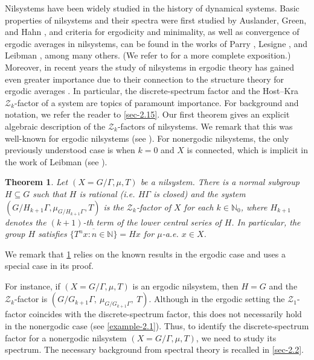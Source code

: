 \documentclass[letter, 11pt]{article}
\newtheorem{theorem}{Theorem}[section]
\theoremstyle{definition}
\theoremstyle{plain}
\newcommand{\N}{\mathbb{N}}
\newcommand{\1}{\mathbbm{1}}
\begin{document}
Nilsystems have been widely studied in the history of dynamical systems. Basic properties of nilsystems and their spectra were first studied by Auslander, Green, and Hahn \cite{Auslander_Green_Hahn63}, and criteria for ergodicity and minimality, as well as convergence of ergodic averages in nilsystems, can be found in the works of Parry \cite{Parry70}, Lesigne \cite{Lesigne_1991}, and Leibman \cite{Leibman05a,Leibman_pointwise_average_polynomial_nil_Zd:2005}, among many others. (We refer to \cite{Host_Kra_nilpotent_structures_ergodic_theory:2018} for a more complete exposition.) Moreover, in recent years the study of nilsystems in ergodic theory has gained even greater importance due to their connection to the structure theory for ergodic averages \cite{Host_Kra_nonconventional_averages_nilmanifolds:2005}. In particular, the discrete-spectrum factor and the Host--Kra $\mathcal{Z}_k$-factor of a system are topics of paramount importance. For background and notation, we refer the reader to \cref{sec-2.15}. Our first theorem gives an explicit algebraic description of the $\mathcal{Z}_k$-factors of nilsystems. We remark that this was well-known for ergodic nilsystems (see \cite[Cf. Chapters 11 and 13]{Host_Kra_nilpotent_structures_ergodic_theory:2018}). For nonergodic nilsystems, the only previously understood case is when $k=0$ and $X$ is connected, which is implicit in the work of Leibman (see \cite[Theorem 2.2]{Leibman03}).
\begin{theorem}\label{Theo-A}
Let $(X=G/\Gamma,\mu,T)$ be a nilsystem. There is a normal subgroup $H\subseteq  G$ such that $H$ is rational (i.e. $H\Gamma$ is closed) and the system $(G/H_{k+1}\Gamma, \mu_{G/H_{k+1}\Gamma},T) $ is the $\mathcal{Z}_k$-factor of $X$ for each $k\in \N_0$, where $H_{k+1}$ denotes the $(k+1)$-th term of the lower central series of $H$. In particular, the group $H$ satisfies $\overline{\{ T^nx: n\in \N\} }= Hx $ for $\mu$-a.e. $x\in X$. 
\end{theorem}
We remark that \cref{Theo-A} relies on the known results in the ergodic case and uses a special case
\cite[Theorem 2.2]{Leibman03} in its proof.

For instance, if $(X=G/\Gamma,\mu,T)$ is an ergodic nilsystem, then $H=G$ and the $\mathcal{Z}_k$-factor is $(G/G_{k+1}\Gamma,\ \mu_{G/G_{k+1}\Gamma},\ T).$
Although in the ergodic setting the $\mathcal{Z}_1$-factor coincides with the discrete-spectrum factor,
this does not necessarily hold in the nonergodic case (see \cref{example-2.1}). Thus, to identify the
discrete-spectrum factor for a nonergodic nilsystem $(X=G/\Gamma,\mu,T)$, we need to study its spectrum. The necessary background from spectral theory is recalled in \cref{sec-2.2}.
\end{document}
